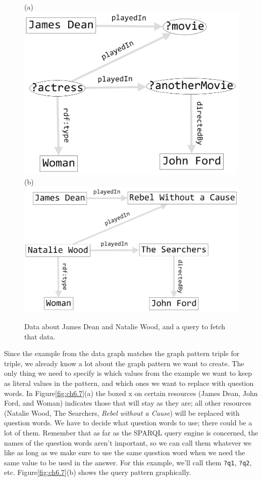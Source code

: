 \begin{figure}
\centering
(a)
\includegraphics[width=5in]{SWWOv3/media/ch6/figure6-6a.png}
(b)
\includegraphics[width=5in]{SWWOv3/media/ch6/figure6-6b.png}
\label{fig:ch6.6}
\caption{Data about James Dean and Natalie Wood, and a query to fetch that data.}
\end{figure}


Since the example from the data graph matches the graph pattern triple
for triple, we already know a lot about the graph pattern we want to
create. The only thing we need to specify is which values from the
example we want to keep as literal values in the pattern, and which ones
we want to replace with
question words. In Figure\ref{fig:ch6.7}(a) the boxed x on certain resources (James
Dean, John Ford, and Woman) indicates those that will stay as they are;
all other resources (Natalie Wood, The Searchers, \emph{Rebel without a
Cause}) will be replaced with question words. We have to decide what
question words to use; there could be a lot of them. Remember that as
far as the SPARQL query engine is concerned, the names of the question
words aren't important, so we can call them whatever we like as long as
we make sure to use the same question word when we need the same value
to be used in the answer. For this example, we'll call them \texttt{?q1}, \texttt{?q2},
etc. Figure\ref{fig:ch6.7}(b) shows the query pattern graphically.

